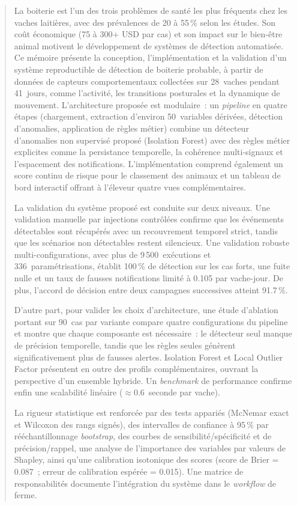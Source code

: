 \begin{abstract}
\noindent
La boiterie est l'un des trois problèmes de santé les plus fréquents chez les vaches
laitières, avec des prévalences de 20 à 55\,\% selon les études. Son coût économique
(75 à 300+ USD par cas) et son impact sur le bien-être animal motivent le développement
de systèmes de détection automatisée. Ce mémoire présente la conception,
l'implémentation et la validation d'un système reproductible de détection de boiterie
probable, à partir de données de capteurs comportementaux collectées sur 28~vaches
pendant 41~jours, comme l'activité, les transitions posturales et la dynamique de
mouvement. L'architecture proposée est modulaire~: un \textit{pipeline} en quatre étapes
(chargement, extraction d'environ 50~variables dérivées, détection d'anomalies,
application de règles métier) combine un détecteur d'anomalies non supervisé proposé
(Isolation Forest) avec des règles métier explicites comme la persistance temporelle,
la cohérence multi-signaux et l'espacement des notifications. L'implémentation comprend
également un score continu de risque pour le classement des animaux et un tableau de
bord interactif offrant à l'éleveur quatre vues complémentaires.

La validation du système proposé est conduite sur deux niveaux. Une validation manuelle
par injections contrôlées confirme que les événements détectables sont récupérés avec
un recouvrement temporel strict, tandis que les scénarios non détectables restent
silencieux. Une validation robuste multi-configurations, avec plus de 9\,500~exécutions et
336~paramétrisations, établit 100\,\% de détection sur les cas forts, une fuite nulle
et un taux de fausses notifications limité à 0.105 par vache-jour. De plus, l'accord
de décision entre deux campagnes successives atteint 91.7\,\%.

D'autre part, pour valider les choix d'architecture, une étude d'ablation portant sur
90~cas par variante compare quatre configurations du pipeline et montre que chaque
composante est nécessaire~: le détecteur seul manque de précision temporelle, tandis
que les règles seules génèrent significativement plus de fausses alertes. Isolation
Forest et Local Outlier Factor présentent en outre des profils complémentaires,
ouvrant la perspective d'un ensemble hybride. Un \textit{benchmark} de performance confirme
enfin une scalabilité linéaire ($\approx$0.6~seconde par vache).

La rigueur statistique est renforcée par des tests appariés (McNemar exact et Wilcoxon
des rangs signés), des intervalles de confiance à 95\,\% par rééchantillonnage
\textit{bootstrap}, des courbes de sensibilité/spécificité et de précision/rappel,
une analyse de l'importance des variables par valeurs de Shapley, ainsi qu'une
calibration isotonique des scores (score de Brier = 0.087~; erreur de calibration
espérée = 0.015). Une matrice de responsabilités documente l'intégration du système
dans le \textit{workflow} de ferme.


\end{abstract}
